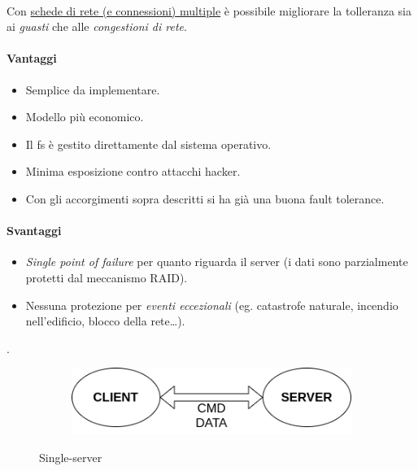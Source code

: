 \documentclass[11pt,a4paper,english]{article}
\begin{document}
\paragraph{} Con \underline{schede di rete (e connessioni) multiple} è possibile migliorare la tolleranza sia ai \emph{guasti} che alle \emph{congestioni di rete}. 

\paragraph{Vantaggi} \begin{itemize}
	\item Semplice da implementare.
	\item Modello più economico.
	\item Il fs è gestito direttamente dal sistema operativo.
	\item Minima esposizione contro attacchi hacker.
	\item Con gli accorgimenti sopra descritti si ha già una buona fault tolerance. 
\end{itemize} 

\paragraph{Svantaggi} \begin{itemize}
	\item \emph{Single point of failure} per quanto riguarda il server (i dati sono parzialmente protetti dal meccanismo RAID).
	\item Nessuna protezione per \emph{eventi eccezionali} (eg. catastrofe naturale, incendio nell'edificio, blocco della rete\dots). 
\end{itemize}. 

\begin{figure}[H]
	\centering
	\begin{subfigure}{0.60\linewidth}
		\includegraphics[width=\linewidth]{../diagrams/architettura/1.png}
	\end{subfigure}
	\caption{Single-server}
\end{figure}
\end{document}
